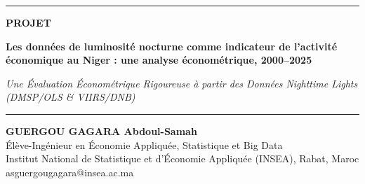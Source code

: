 \begin{titlepage}
    \centering
    \thispagestyle{empty}
    \vspace*{0.35cm}

    {\color{accentblue}\rule{\textwidth}{2pt}}\par
    \vspace{0.65cm}
    {\small\bfseries\color{accentblue} PROJET}\\[0.65cm]

    {\fontsize{24}{29}\selectfont\bfseries\color{navyblue} Les données de luminosité nocturne comme indicateur de l’activité économique au Niger : une analyse économétrique, 2000–2025 \par}
    
    \vspace{0.45cm}
    
    {\large\itshape\color{darkgray} Une Évaluation Économétrique Rigoureuse à partir des Données Nighttime Lights (DMSP/OLS \& VIIRS/DNB) \par}

    \vspace{0.65cm}
    {\color{accentblue}\rule{0.45\textwidth}{0.6pt}}
    \vspace{0.7cm}

    {\large \bfseries GUERGOU GAGARA Abdoul-Samah}\\[0.2cm]
    {\small Élève-Ingénieur en Économie Appliquée, Statistique et Big Data}\\[0.1cm]
    {\small Institut National de Statistique et d'Économie Appliquée (INSEA), Rabat, Maroc}\\[0.1cm]
    {\small\ttfamily asguergougagara@insea.ac.ma}\\[1.0cm]


\end{titlepage}
